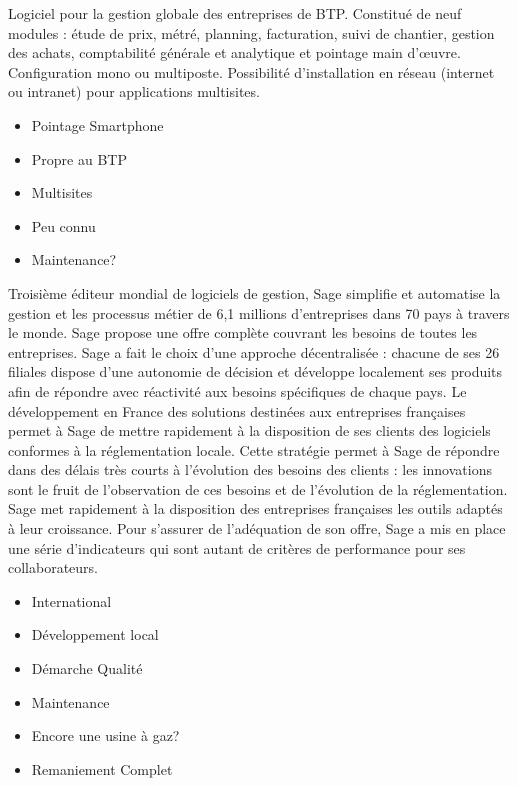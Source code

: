 {
    Logiciel pour la gestion globale des entreprises de BTP. Constitué de neuf modules : étude de prix, métré, planning, facturation, suivi de chantier, gestion des achats, comptabilité générale et analytique et pointage main d'\oe uvre.
    Configuration mono ou multiposte. Possibilité d'installation en réseau (internet ou intranet) pour applications multisites.
}
{
    \begin{itemize}
      \item Pointage Smartphone
      \item Propre au BTP
      \item Multisites
    \end{itemize}
}
{
    \begin{itemize}
        \item Peu connu
        \item Maintenance?             
    \end{itemize}
}

{
	Troisième éditeur mondial de logiciels de gestion, Sage simplifie et automatise la gestion et les processus métier de 6,1 millions d'entreprises dans 70 pays à travers le monde.
	Sage propose une offre complète couvrant les besoins de toutes les entreprises.
	Sage a fait le choix d'une approche décentralisée : chacune de ses 26 filiales dispose d'une autonomie
	de décision et développe localement ses produits afin de répondre avec réactivité aux besoins spécifiques de chaque pays.
	Le développement en France des solutions destinées aux entreprises françaises permet  à  Sage de mettre rapidement à la disposition de ses clients des logiciels conformes à la réglementation locale.
	Cette stratégie permet à Sage de répondre dans des délais très courts  à  l'évolution des besoins des clients : les innovations sont le fruit de l'observation de ces besoins et de l'évolution de la réglementation.
	Sage met rapidement à la disposition des entreprises françaises les outils adaptés à leur croissance.
	Pour s'assurer de l'adéquation de son offre, Sage a mis en place une série d'indicateurs qui sont autant de critères de performance pour ses collaborateurs.
}
{
    \begin{itemize}
        \item International
        \item Développement local
        \item Démarche Qualité
        \item Maintenance
    \end{itemize}
}
{
    \begin{itemize}
        \item Encore une usine à gaz?
        \item Remaniement Complet
    \end{itemize}
}
 
